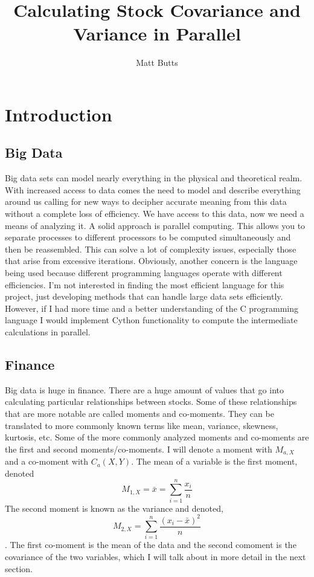 \documentclass{article}
\begin{document}
\title{Calculating Stock Covariance and Variance in Parallel}
\author{Matt Butts}

\maketitle
\tableofcontents
\newpage
 \section{Introduction}
     \subsection{Big Data}
Big data sets can model nearly everything in the physical and theoretical realm. With increased access to data comes the need to model and describe everything around us calling for new ways to decipher accurate meaning from this data without a complete loss of efficiency. We have access to this data, now we need a means of analyzing it. A solid approach is parallel computing. This allows you to separate processes to different processors to be computed simultaneously and then be reassembled. This can solve a lot of complexity issues, especially those that arise from excessive iterations. Obviously, another concern is the language being used because different programming languages operate with different efficiencies. I'm not interested in finding the most efficient language for this project, just developing methods that can handle large data sets efficiently. However, if I had more time and a better understanding of the C programming language I would implement Cython functionality to compute the intermediate calculations in parallel.\cite{bigdata}

    \subsection{Finance}
Big data is huge in finance. There are a huge amount of values that go into calculating particular relationships between stocks. Some of these relationships that are more notable are called moments and co-moments. They can be translated to more commonly known terms like mean, variance, skewness, kurtosis, etc. Some of the more commonly analyzed moments and co-moments are the first and second moments/co-moments. I will denote a moment with $M_{a, X}$ and a co-moment with $C_{a}(X,Y)$. The mean of a variable is the first moment, denoted $$M_{1, X} = \bar{x} = \sum\limits_{i=1}^n \frac{x_i}{n}$$ \label{first-moment} The second moment is known as the variance and denoted, \label{second-moment}$$M_{2, X} = \sum\limits_{i=1}^n \frac{(x_i - \bar{x})^2}{n}$$. The first co-moment is the mean of the data and the second comoment is the covariance of the two variables, which I will talk about in more detail in the next section. \cite{wiki}
     
\end{document}
